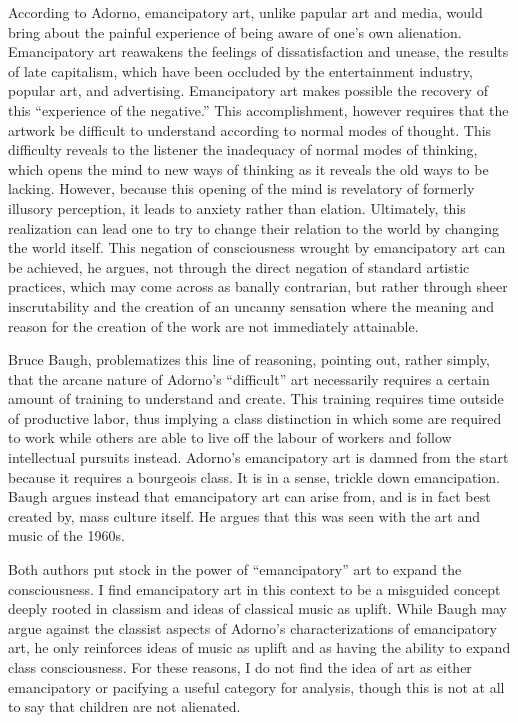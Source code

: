 \documentclass[12pt,letterpaper]{article}
\providecommand{\DIFadd}[1]{{\protect\color{blue}\uwave{#1}}} %
\providecommand{\DIFaddbegin}{} %
\providecommand{\DIFaddend}{} %
\newcommand{\DIFaddincludegraphics}[2][]{{\color{blue}\fbox{\DIFOincludegraphics[#1]{#2}}}} %
\DeclareRobustCommand{\DIFaddbegin}{\DIFOaddbegin \let\includegraphics\DIFaddincludegraphics} %
\DeclareRobustCommand{\DIFaddend}{\DIFOaddend \let\includegraphics\DIFOincludegraphics} %
\begin{document}
	According to Adorno, emancipatory art, unlike papular art and media, 
	would bring about the painful experience of being aware of one's own 
	alienation. Emancipatory art reawakens the feelings of dissatisfaction 
	and unease, the results of late capitalism, which have been occluded by
	the entertainment industry, popular art, and advertising. Emancipatory 
	art makes possible the recovery of this ``experience of the negative.''
	This accomplishment, however requires that the artwork be difficult to 
	understand according to normal modes of thought. This difficulty reveals
	to the listener the inadequacy of normal modes of thinking, which opens 
	the mind to new ways of thinking as it reveals the old ways to be 
	lacking. However, because this opening of the mind is revelatory of 
	formerly illusory perception, it leads to anxiety rather than elation. 
	Ultimately, this realization can lead one to try to change their 
	relation to the world by changing the world 
	itself.\autocite[67--69]{Baugh}    
	This negation of consciousness wrought by emancipatory art can be 
	achieved, he argues, not through the direct negation of standard 
	artistic practices, which may come across as banally contrarian, but 
	rather through sheer inscrutability and the creation of an uncanny 
	sensation where the meaning and reason for the creation of the work are
	not immediately attainable.\autocite[71]{Baugh}

	Bruce Baugh, problematizes this line of reasoning, pointing out, rather
	simply, that the arcane nature of Adorno's ``difficult'' art necessarily
	requires a certain amount of training to understand and create. This 
	training requires time outside of productive labor, thus implying a 
	class distinction in which some are required to work while others are 
	able to live off the labour of workers and follow intellectual pursuits
	instead. Adorno's emancipatory art is damned from the start because it 
	requires a bourgeois class. \autocite[74]{Baugh} It is in a sense, 
	trickle down emancipation. Baugh argues instead that emancipatory art 
	can arise from,
	and is in fact best created by, mass culture itself. He argues that this
	was seen with the art and music of the 1960s.\autocite[77]{Baugh}

	Both authors put stock in the power of ``emancipatory'' art to expand 
	the consciousness. I find emancipatory art in this context to be a 
	misguided concept deeply rooted in classism and ideas of classical music
	as uplift. While Baugh may argue against the classist aspects of 
	Adorno's
	characterizations of emancipatory art, he only reinforces ideas of music
	\DIFaddbegin \DIFadd{in general 
	}\DIFaddend as uplift and as having the ability to expand class consciousness.
	For these reasons, I do not 
	find the idea of art as either emancipatory or pacifying a useful
	category for analysis, though this is not at all to say that children
	are not alienated. 
\end{document}
